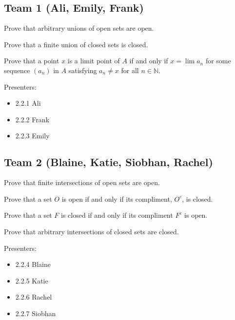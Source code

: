 \subsection*{Team 1 (Ali, Emily, Frank)} 
\par\vspace{1 cm}
\begin{problem*}
Prove that arbitrary unions of open sets are open.  
\end{problem*}
\par\vspace{1 cm}
\begin{problem*}
Prove that a finite union of closed sets is closed.
\end{problem*}
\par\vspace{1 cm}
\begin{problem*}
Prove that a point $x$ is a limit point of $A$ if and only if $x=\lim a_n$ for some sequence $(a_n)$ in $A$ satisfying $a_n\neq x$ for all $n\in\mathbb{N}$. 
\end{problem*}
\par\vspace{1 cm}
Presenters:
\begin{itemize}
\item 2.2.1  Ali
\item 2.2.2  Frank
\item 2.2.3  Emily
\end{itemize}
\subsection*{Team 2 (Blaine, Katie, Siobhan, Rachel)} 
\par\vspace{1 cm}
\begin{problem*}
Prove that finite intersections of open sets are open.
\end{problem*}
\par\vspace{1 cm} 

\begin{problem*}
Prove that a set $O$ is open if and only if its compliment, $O^c$, is closed.
\end{problem*}
\par\vspace{1 cm}

\begin{problem*}
Prove that a set $F$ is closed if and only if its compliment $F^c$ is open.

\end{problem*}
\begin{problem*}
Prove that arbitrary intersections of closed sets are closed.
\end{problem*}
Presenters:
\begin{itemize}
\item 2.2.4  Blaine
\item 2.2.5  Katie
\item 2.2.6  Rachel
\item 2.2.7  Siobhan
\end{itemize}


